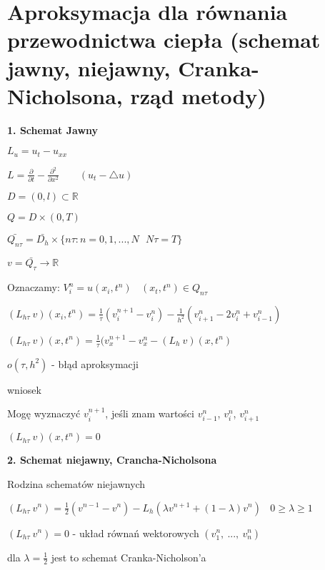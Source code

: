 \section{Aproksymacja dla równania przewodnictwa ciepła (schemat jawny, niejawny, Cranka-Nicholsona, rząd metody)}

\textbf{1. Schemat Jawny}

$L_u = u_t - u_{xx}$

$L = \frac{\partial}{\partial t} - \frac{\partial^2}{\partial x^2}\ \ \ \ \ \ \ \ \ (u_t - \bigtriangleup u)$

$D = (0,l) \subset \mathbb{R}$

$Q = D \times (0,T)$

$\bar{Q_{n\tau}} = \bar{D_h} \times \{ n\tau : n = 0, 1, ..., N\ \ \ N\tau = T\}$

$v = \bar{Q_\tau} \rightarrow \mathbb{R}$

Oznaczamy: $V^n_i = u(x_i,t^n)\ \ \ \ (x_t,t^n) \in Q_{n\tau}$

$(L_{h\tau}\ v)(x_i, t^n) = \frac{1}{\tau} (v^{n+1}_i - v^n_i) - \frac{1}{h^2} (v^n_{i+1} - 2v^n_i + v^n_{i-1})$

$(L_{h\tau}\ v)(x, t^n) = \frac{1}{\tau} (v^{n+1}_x - v^n_x - (L_h\ v)(x, t^n)$

$o(\tau, h^2)$ - błąd aproksymacji

wniosek

Mogę wyznaczyć $v^{n+1}_i$, jeśli znam wartości $v^{n}_{i-1}$, $v^{n}_{i}$, $v^{n}_{i+1}$

$(L_{h\tau}\ v)(x, t^n) = 0$

\textbf{2. Schemat niejawny, Crancha-Nicholsona}

Rodzina schematów niejawnych

$(L_{h\tau}\ v^n) = \frac{1}{2} (v^{n-1} - v^{n}) - L_h (\lambda v^{n+1} + (1-\lambda)v^{n})\ \ \ \ 0 \geqslant \lambda \geqslant 1$

$(L_{h\tau}\ v^n) = 0$ - układ równań wektorowych $(v^n_1,\ ...,\ v^n_n)$

dla $\lambda = \frac{1}{2}$ jest to schemat Cranka-Nicholson'a


